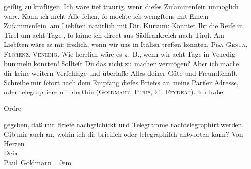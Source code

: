 \begin{ledgroupsized}[t]{13cm}
               geiſtig zu kräftigen. Ich wäre tief traurig, wenn dieſes Zuſammenſein unmöglich wäre.
               Kann {\pb} ich nicht Alle ſehen, ſo möchte ich wenigſtens mit
               Einem Zuſammenſein, am Liebſten natürlich mit Dir.\pend
           \pstart
           Kurzum: Könntet Ihr die Reiſe in Tirol um acht
               Tage \label{K_L02610-1v}\label{K_L02610-1h}, ſo käme ich direct aus Südfrankreich nach Tirol.
               Am Liebſten wäre es mir freilich, wenn wir uns in Italien treffen könnten. \textsc{Pisa}{ }\textsc{Genua}, \textsc{Florenz}, \textsc{Venedig}. Wie herrlich wäre
               es z. B., wenn wir acht Tage in Venedig bummeln könnten! Sollteſt Du das nicht zu {\pb}machen vermögen? Aber ich mache dir keine weitern
               Vorſchläge und überlaſſe Alles deiner Güte und Freundſchaft.\pend
           \pstart
           Schreibe mir ſofort nach dem Empfang dieſes Briefes an meine Pariſer Adresse, oder telegraphiere mir dorthin (\textsc{Goldmann}, \textsc{Paris, 24. Feydeau}). Ich habe \begin{otherlanguage}{french}Ordre\end{otherlanguage} gegeben, daß mir Briefe nachgeſchickt und Telegramme
               nachtelegraphirt werden. Gib mir auch an, wohin ich dir brieflich oder telegraphiſch
               antworten kann?\pend
           \pstart
           Von Herzen{\\[\baselineskip]} Dein{\\[\baselineskip]}\spacefill\mbox{Paul Goldmann}\pend
           \leftskip=0em{}\pstart
           \noindent{}{\pb}\label{T_L02610-1v}\label{T_L02610-1h}\pend
                     \endnumbering{}\end{ledgroupsized}  \newcommand{\dateiname}{L02610}\newcommand{\titel}{Paul Goldmann an Arthur Schnitzler, 9. 8. [1894]}\newcommand{\editorInnen}{Martin Anton Müller und Laura Untner}
            \footnotesize
\begin{ledgroupsized}[t]{11.5cm}
\end{ledgroupsized}
         
      